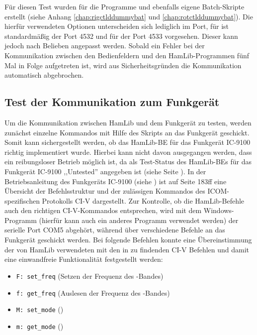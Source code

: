 Für diesen Test wurden für die Programme  und  ebenfalls eigene Batch-Skripte erstellt (siehe Anhang \ref{chap:rigctlddummybat} und \ref{chap:rotctlddummybat}). Die hierfür verwendeten Optionen unterscheiden sich lediglich im Port, für  ist standardmäßig der Port 4532 und für  der Port 4533 vorgesehen. Dieser kann jedoch nach Belieben angepasst werden.
\clearpage
Sobald ein Fehler bei der Kommunikation zwischen den Bedienfeldern und den HamLib-Programmen fünf Mal in Folge aufgetreten ist, wird aus Sicherheitsgründen die Kommunikation automatisch abgebrochen.

\subsection{Test der Kommunikation zum Funkgerät}

Um die Kommunikation zwischen HamLib und dem Funkgerät zu testen, werden zunächst einzelne Kommandos mit Hilfe des Skripts  an das Funkgerät geschickt. Somit kann sichergestellt werden, ob das HamLib-\acl{BE} für das Funkgerät IC-9100 richtig implementiert wurde. Hierbei kann nicht davon ausgegangen werden, dass ein reibungsloser Betrieb möglich ist, da als Test-Status des HamLib-\acl{BE}s für das Funkgerät IC-9100 ,,Untested'' angegeben ist (siehe Seite \pageref{hamlibbackend}).\newpar
In der Betriebsanleitung des Funkgeräts IC-9100 (siehe \cite{radiomanual}) ist auf Seite 183ff eine Übersicht der Befehlsstruktur und der zulässigen Kommandos des ICOM-spezifischen Protokolls CI-V dargestellt. Zur Kontrolle, ob die HamLib-Befehle auch den richtigen CI-V-Kommandos entsprechen, wird mit dem Windows-Programm  (hierfür kann auch ein anderes Programm verwendet werden) der serielle Port COM5 abgehört, während über  verschiedene Befehle an das Funkgerät geschickt werden.\newpar
Bei folgende Befehlen konnte eine Übereinstimmung der von HamLib verwendeten mit den in \cite{radiomanual} zu findenden CI-V Befehlen und damit eine einwandfreie Funktionalität festgestellt werden:

\begin{itemize}
	\parskip0pt
	\item \texttt{F: set\_freq} (Setzen der Frequenz des -Bandes)
	\item \texttt{f: get\_freq} (Auslesen der Frequenz des -Bandes)
	\item \texttt{M: set\_mode} ()
	\item \texttt{m: get\_mode} ()
\end{itemize}

